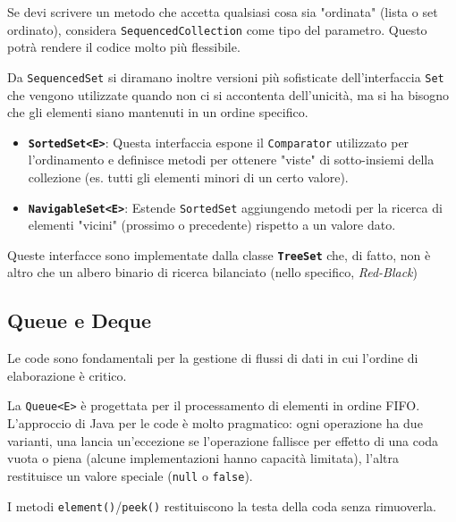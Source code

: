 \begin{tip}[]
Se devi scrivere un metodo che accetta qualsiasi cosa sia "ordinata" (lista o set ordinato), considera \texttt{SequencedCollection} come tipo del parametro. Questo potrà rendere il codice molto più flessibile.
\end{tip}

Da \texttt{SequencedSet} si diramano inoltre versioni più sofisticate dell'interfaccia \texttt{Set} che vengono utilizzate quando non ci si accontenta dell'unicità, ma si ha bisogno che gli elementi siano mantenuti in un ordine specifico.

\begin{itemize}
    \item \textbf{\texttt{SortedSet<E>}}: Questa interfaccia espone il \texttt{Comparator} utilizzato per l'ordinamento e definisce metodi per ottenere "viste" di sotto-insiemi della collezione (es. tutti gli elementi minori di un certo valore).
    \item \textbf{\texttt{NavigableSet<E>}}: Estende \texttt{SortedSet} aggiungendo metodi per la ricerca di elementi "vicini" (prossimo o precedente) rispetto a un valore dato. 
\end{itemize}

\begin{observation}
Queste interfacce sono implementate dalla classe \textbf{\texttt{TreeSet}} che, di fatto, non è altro che un albero binario di ricerca bilanciato (nello specifico, \textit{Red-Black})
\end{observation}

\subsection{Queue e Deque}

Le code sono fondamentali per la gestione di flussi di dati in cui l'ordine di elaborazione è critico.

La \texttt{Queue<E>} è progettata per il processamento di elementi in ordine FIFO. L'approccio di Java per le code è molto pragmatico: ogni operazione ha due varianti, una lancia un'eccezione se l'operazione fallisce per effetto di una coda vuota o piena (alcune implementazioni hanno capacità limitata), l'altra restituisce un valore speciale (\texttt{null} o \texttt{false}). 

I metodi \texttt{element()}/\texttt{peek()} restituiscono la testa della coda senza rimuoverla. 

